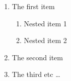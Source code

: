 \documentclass{article}
\begin{document}
   \begin{enumerate}
       \item The first item
            \begin{enumerate}
                     \item Nested item 1
                     \item Nested item 2
            \end{enumerate}
                     \item The second item
                     \item The third etc \ldots
    \end{enumerate}
\end{document}
